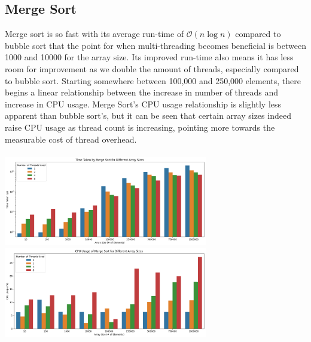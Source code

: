 \documentclass[conference]{IEEEtran}
\begin{document}
\subsection{Merge Sort}
Merge sort is so fast with its average run-time of $\mathcal{O}(n\log{}n)$ compared to bubble sort that the point for when multi-threading becomes beneficial is between 1000 and 10000 for the array size. Its improved run-time also means it has less room for improvement as we double the amount of threads, especially compared to bubble sort.
Starting somewhere between 100,000 and 250,000 elements, there begins a linear relationship between the increase in number of threads and increase in CPU usage. Merge Sort's CPU usage relationship is slightly less apparent than bubble sort's, but it can be seen that certain array sizes indeed raise CPU usage as thread count is increasing, pointing more towards the measurable cost of thread overhead. 
\\\\
\includegraphics[width=3.5in]{MergeSortTimeTaken.png}
\includegraphics[width=3.5in]{MergeSortCPUUsage.png}
\end{document}
